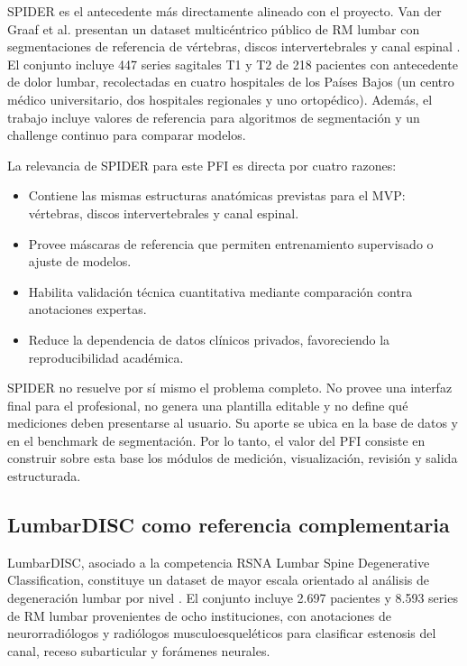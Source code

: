 SPIDER es el antecedente más directamente alineado con el proyecto. Van der Graaf et al. presentan un dataset multicéntrico público de RM lumbar con segmentaciones de referencia de vértebras, discos intervertebrales y canal espinal \parencite{vandergraaf_spider_2024}. El conjunto incluye 447 series sagitales T1 y T2 de 218 pacientes con antecedente de dolor lumbar, recolectadas en cuatro hospitales de los Países Bajos (un centro médico universitario, dos hospitales regionales y uno ortopédico). Además, el trabajo incluye valores de referencia para algoritmos de segmentación y un challenge continuo para comparar modelos.

La relevancia de SPIDER para este PFI es directa por cuatro razones:

\begin{itemize}
  \item Contiene las mismas estructuras anatómicas previstas para el MVP: vértebras, discos intervertebrales y canal espinal.
  \item Provee máscaras de referencia que permiten entrenamiento supervisado o ajuste de modelos.
  \item Habilita validación técnica cuantitativa mediante comparación contra anotaciones expertas.
  \item Reduce la dependencia de datos clínicos privados, favoreciendo la reproducibilidad académica.
\end{itemize}

SPIDER no resuelve por sí mismo el problema completo. No provee una interfaz final para el profesional, no genera una plantilla editable y no define qué mediciones deben presentarse al usuario. Su aporte se ubica en la base de datos y en el benchmark de segmentación. Por lo tanto, el valor del PFI consiste en construir sobre esta base los módulos de medición, visualización, revisión y salida estructurada.

\subsection{LumbarDISC como referencia complementaria}

LumbarDISC, asociado a la competencia RSNA Lumbar Spine Degenerative Classification, constituye un dataset de mayor escala orientado al análisis de degeneración lumbar por nivel \parencite{richards_lumbardisc_2026}. El conjunto incluye 2.697 pacientes y 8.593 series de RM lumbar provenientes de ocho instituciones, con anotaciones de neurorradiólogos y radiólogos musculoesqueléticos para clasificar estenosis del canal, receso subarticular y forámenes neurales.

